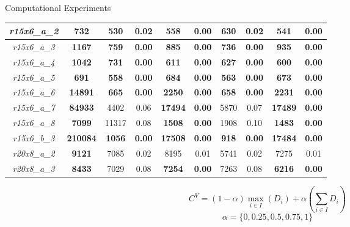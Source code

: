\documentclass[xcolor=dvipsnames, mathserif, 10pt]{beamer}
\begin{document}
\begin{frame}{Computational Experiments}
\begin{table}[htbp]
{\begin{tabular}{|c|c|c|c|c|c|c|c|c|c|}
    \hline
    \textit{r15x6\_a\_2} & \textbf{732} & 530   & 0.02  & \textbf{558} & \textbf{0.00} & 630   & 0.02  & \textbf{541} & \textbf{0.00} \bigstrut\\
    \hline
    \textit{r15x6\_a\_3} & \textbf{1167} & \textbf{759} & \textbf{0.00} & \textbf{885} & \textbf{0.00} & \textbf{736} & \textbf{0.00} & \textbf{935} & \textbf{0.00} \bigstrut\\
    \hline
    \textit{r15x6\_a\_4} & \textbf{1042} & \textbf{731} & \textbf{0.00} & \textbf{611} & \textbf{0.00} & \textbf{627} & \textbf{0.00} & \textbf{600} & \textbf{0.00} \bigstrut\\
    \hline
    \textit{r15x6\_a\_5} & \textbf{691} & \textbf{558} & \textbf{0.00} & \textbf{684} & \textbf{0.00} & \textbf{563} & \textbf{0.00} & \textbf{673} & \textbf{0.00} \bigstrut\\
    \hline
    \textit{r15x6\_a\_6} & \textbf{14891} & \textbf{665} & \textbf{0.00} & \textbf{2250} & \textbf{0.00} & \textbf{658} & \textbf{0.00} & \textbf{2231} & \textbf{0.00} \bigstrut\\
    \hline
    \textit{r15x6\_a\_7} & \textbf{84933} & 4402  & 0.06  & \textbf{17494} & \textbf{0.00} & 5870  & 0.07  & \textbf{17489} & \textbf{0.00} \bigstrut\\
    \hline
    \textit{r15x6\_a\_8} & \textbf{7099} & 11317 & 0.08  & \textbf{1508} & \textbf{0.00} & 1908  & 0.10  & \textbf{1483} & \textbf{0.00} \bigstrut\\
    \hline
    \textit{r15x6\_b\_3} & \textbf{210084} & \textbf{1056} & \textbf{0.00} & \textbf{17508} & \textbf{0.00} & \textbf{918} & \textbf{0.00} & \textbf{17484} & \textbf{0.00} \bigstrut\\
    \hline
    \textit{r20x8\_a\_2} & \textbf{9121} & 7085  & 0.02  & 8195  & 0.01  & 5741  & 0.02  & 7275  & 0.01 \bigstrut\\
    \hline
    \textit{r20x8\_a\_3} & \textbf{8433} & 7029  & 0.08  & \textbf{7254} & \textbf{0.00} & 7263  & 0.08  & \textbf{6216} & \textbf{0.00} \bigstrut\\
    \hline

    \end{tabular}}
  \label{tab:addlabel}%
\end{table}%
$$C^V= (1-\alpha)\max_{i \in I}({D_i})+ \alpha(\sum_{i \in I} D_i)$$
$$\alpha=\{0, 0.25, 0.5, 0.75, 1\}$$

\end{frame}
\end{document}
